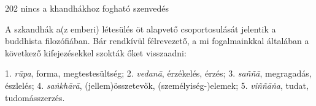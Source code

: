 
\begin{notesdescription}


\item[{202}
{nincs a khandhákhoz fogható szenvedés}
{}] \hfill\par

A szkandhák a(z emberi) létesülés öt alapvető csoportosulását jelentik a buddhista filozófiában. Bár rendkívül félrevezető, a mi fogalmainkkal általában a következő kifejezésekkel szokták őket visszaadni:

1. \textit{r\=upa}, forma, megtestesültség; 2. \textit{vedan\=a}, érzékelés, érzés; 3. \textit{sa\~n\~n\=a}, megragadás, észlelés; 4. \textit{sa\.nkh\=ar\=a}, (jellem)összetevők, (személyiség-)elemek; 5. \textit{vi\~n\~n\=a\.na}, tudat, tudomásszerzés.

\end{notesdescription}

